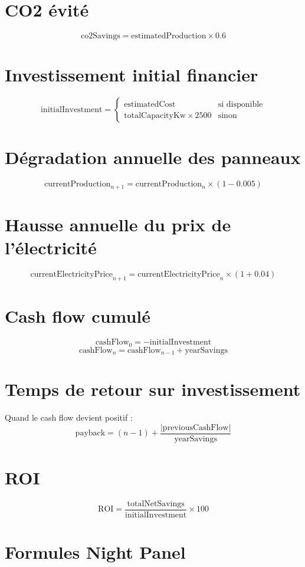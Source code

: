 \documentclass[12pt,a4paper]{article}
\begin{document}
\section{CO2 évité}
\[
\text{co2Savings} = \text{estimatedProduction} \times 0.6
\]

\section{Investissement initial financier}
\[
\text{initialInvestment} =
\begin{cases}
\text{estimatedCost} & \text{si disponible} \\
\text{totalCapacityKw} \times 2500 & \text{sinon}
\end{cases}
\]

\section{Dégradation annuelle des panneaux}
\[
\text{currentProduction}_{n+1} = \text{currentProduction}_n \times (1 - 0.005)
\]

\section{Hausse annuelle du prix de l'électricité}
\[
\text{currentElectricityPrice}_{n+1} = \text{currentElectricityPrice}_n \times (1 + 0.04)
\]

\section{Cash flow cumulé}
\[
\text{cashFlow}_0 = -\text{initialInvestment}
\]
\[
\text{cashFlow}_n = \text{cashFlow}_{n-1} + \text{yearSavings}
\]

\section{Temps de retour sur investissement}
Quand le cash flow devient positif :
\[
\text{payback} = (n-1) + \frac{|\text{previousCashFlow}|}{\text{yearSavings}}
\]

\section{ROI}
\[
\text{ROI} = \frac{\text{totalNetSavings}}{\text{initialInvestment}} \times 100
\]

\section{Formules Night Panel}
\end{document}
